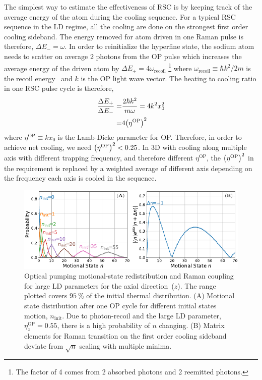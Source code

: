 The simplest way to estimate the effectiveness of RSC
is by keeping track of the average energy of the atom during the cooling sequence.
For a typical RSC sequence in the LD regime, all the cooling are done on
the strongest first order cooling sideband.
The energy removed for atom driven in one Raman pulse is therefore, $\Delta E_-=\omega$.
In order to reinitialize the hyperfine state, the sodium atom needs to scatter on average
$2$ photons from the OP pulse which increases the average energy of the driven atom
by $\Delta E_+=4\omega_{\mathrm{recoil}}$
\footnote{The factor of 4 comes from 2 absorbed photons and 2 reemitted photons.}
where $\omega_{\mathrm{recoil}}\equiv \hbar k^2/2m$ is the recoil energy~\cite{steck_sodium_nodate}
and $k$ is the OP light wave vector.
The heating to cooling ratio in one RSC pulse cycle is therefore,
\begin{align*}
  \frac{\Delta E_+}{\Delta E_-}=&\frac{2\hbar k^2}{m\omega}=4k^2x_0^2\\
  =&4{\left({\eta^{\mathrm{OP}}}\right)}^2
\end{align*}
where $\eta^{\mathrm{OP}}\equiv kx_0$ is the Lamb-Dicke parameter for OP.
Therefore, in order to achieve net cooling, we need ${\left({\eta^{\mathrm{OP}}}\right)}^2<0.25$.
In 3D with cooling along multiple axis with different trapping frequency,
and therefore different $\eta^{\mathrm{OP}}$,
the ${\left({\eta^{\mathrm{OP}}}\right)}^2$ in the requirement
is replaced by a weighted average of different axis depending on the frequency
each axis is cooled in the sequence.

\begin{figure}
  \centering
  \includegraphics[width=\textwidth]{figures/na_rsc_challenges.pdf}
  \caption[Optical pumping motional-state redistribution and Raman coupling]{
    Optical pumping motional-state redistribution and Raman coupling for large LD parameters
    for the axial direction~($z$).
    The range plotted covers $95~\mathrm{\%}$ of the initial thermal distribution.
    (A) Motional state distribution after one OP cycle for different initial states motion,
    $n_{\textrm{init}}$.
    Due to photon-recoil and the large LD parameter, $\eta^{\textrm{OP}}_z=0.55$,
    there is a high probability of $n$ changing.
    (B) Matrix elements for Raman transition on the first order cooling sideband
    deviate from $\sqrt{n}$ scaling with multiple minima.
    \label{fig:rsc:na-challenges}}
\end{figure}

